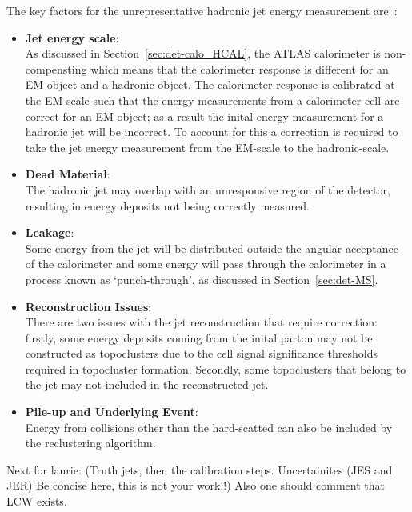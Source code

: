 \noindent
The key factors for the unrepresentative hadronic jet energy measurement are~\cite{obj-bjets_algo_2015,det-thesis_kate}:
\begin{itemize}
\item\textbf{Jet energy scale}:\\
  As discussed in Section~\ref{sec:det-calo_HCAL}, the ATLAS calorimeter is non-compensting which means that
  the calorimeter response is different for an EM-object and a hadronic object.
  The calorimeter response is calibrated at the EM-scale such that the energy measurements from a calorimeter cell
  are correct for an EM-object;
  as a result the inital energy measurement for a hadronic jet will be incorrect.
  To account for this a correction is required to take the jet energy measurement from the EM-scale to the hadronic-scale.\\
\item\textbf{Dead Material}:\\
  The hadronic jet may overlap with an unresponsive region of the detector,
  resulting in energy deposits not being correctly measured.\\
\item\textbf{Leakage}:\\
  Some energy from the jet will be distributed outside the angular acceptance of the calorimeter
  and some energy will pass through the calorimeter in a process known as `punch-through', as discussed in Section~\ref{sec:det-MS}.\\
\item\textbf{Reconstruction Issues}:\\
  There are two issues with the jet reconstruction that require correction:
  firstly, some energy deposits coming from the inital parton may not be constructed as topoclusters due to the cell signal significance thresholds required in topocluster formation.
  Secondly, some topoclusters that belong to the jet may not included in the reconstructed jet.\\
\item\textbf{Pile-up and Underlying Event}:\\
  Energy from collisions other than the hard-scatted can also be included by the reclustering algorithm.\\
\end{itemize}

Next for laurie: (Truth jets, then the calibration steps. Uncertainites (JES and JER)
Be concise here, this is not your work!!)
Also one should comment that LCW exists.

